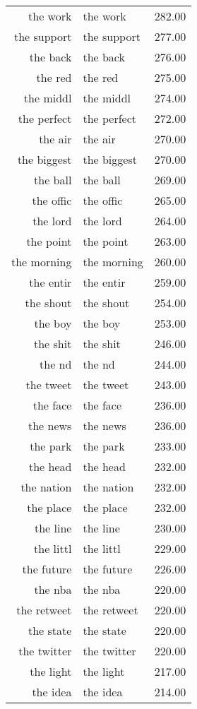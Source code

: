 \begin{table}[ht]
\begin{tabular}{rlr}
  the work & the work & 282.00 \\ 
  the support & the support & 277.00 \\ 
  the back & the back & 276.00 \\ 
  the red & the red & 275.00 \\ 
  the middl & the middl & 274.00 \\ 
  the perfect & the perfect & 272.00 \\ 
  the air & the air & 270.00 \\ 
  the biggest & the biggest & 270.00 \\ 
  the ball & the ball & 269.00 \\ 
  the offic & the offic & 265.00 \\ 
  the lord & the lord & 264.00 \\ 
  the point & the point & 263.00 \\ 
  the morning & the morning & 260.00 \\ 
  the entir & the entir & 259.00 \\ 
  the shout & the shout & 254.00 \\ 
  the boy & the boy & 253.00 \\ 
  the shit & the shit & 246.00 \\ 
  the nd & the nd & 244.00 \\ 
  the tweet & the tweet & 243.00 \\ 
  the face & the face & 236.00 \\ 
  the news & the news & 236.00 \\ 
  the park & the park & 233.00 \\ 
  the head & the head & 232.00 \\ 
  the nation & the nation & 232.00 \\ 
  the place & the place & 232.00 \\ 
  the line & the line & 230.00 \\ 
  the littl & the littl & 229.00 \\ 
  the future & the future & 226.00 \\ 
  the nba & the nba & 220.00 \\ 
  the retweet & the retweet & 220.00 \\ 
  the state & the state & 220.00 \\ 
  the twitter & the twitter & 220.00 \\ 
  the light & the light & 217.00 \\ 
  the idea & the idea & 214.00 \\ 

\end{tabular}
\end{table}
